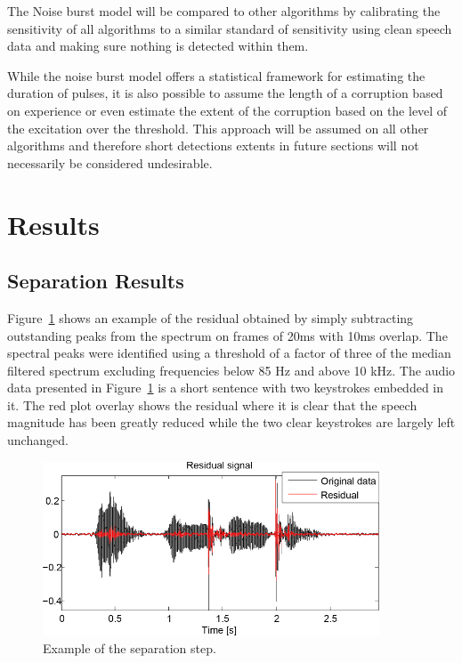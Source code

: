 The Noise burst model will be compared to other algorithms by calibrating the sensitivity of all algorithms to a similar standard of sensitivity using clean speech data and making sure nothing is detected within them.

While the noise burst model offers a statistical framework for estimating the duration of pulses, it is also possible to assume the length of a corruption based on experience or even estimate the extent of the corruption based on the level of the excitation over the threshold. This approach will be assumed on all other algorithms and therefore short detections extents in future sections will not necessarily be considered undesirable.

\section{Results}\label{sec:WPresults}
\subsection{Separation Results} %
Figure~\ref{fig:Separation_Residual_Example} shows an example of the residual obtained by simply subtracting outstanding peaks from the spectrum on frames of 20ms with 10ms overlap. The spectral peaks were identified using a threshold of a factor of three of the median filtered spectrum excluding frequencies below 85 Hz and above 10 kHz. The audio data presented in Figure~\ref{fig:Separation_Residual_Example} is a short sentence with two keystrokes embedded in it. The red plot overlay shows the residual where it is clear that the speech magnitude has been greatly reduced while the two clear keystrokes are largely left unchanged. 

\begin{figure}
\begin{minipage}[b]{1.0\linewidth}
  \centering
  \centerline{\includegraphics[width=10cm]{Separation_Residual_Example}}
\end{minipage}
\caption{Example of the separation step.}
\label{fig:Separation_Residual_Example}
\end{figure}

